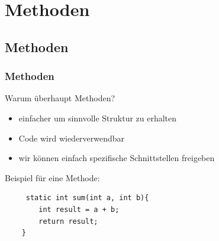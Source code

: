 \section{Methoden}

\subsection{Methoden}

\begin{frame}[fragile] %
\frametitle{Methoden}
Warum überhaupt Methoden?
\begin{itemize}
    \item einfacher um sinnvolle Struktur zu erhalten
    \item Code wird wiederverwendbar
    \item wir können einfach spezifische Schnittstellen freigeben
\end{itemize}
Beispiel für eine Methode:
\begin{lstlisting}
     static int sum(int a, int b){
        int result = a + b;
        return result;
    }
\end{lstlisting}
\end{frame}

